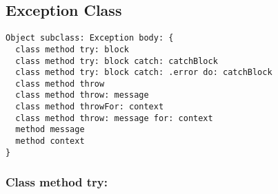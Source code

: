 \subsection {Exception Class}

\begin{lstlisting}
Object subclass: Exception body: {
  class method try: block
  class method try: block catch: catchBlock
  class method try: block catch: .error do: catchBlock
  class method throw
  class method throw: message
  class method throwFor: context
  class method throw: message for: context
  method message
  method context
}
\end{lstlisting}

\subsubsection{Class method try:}
